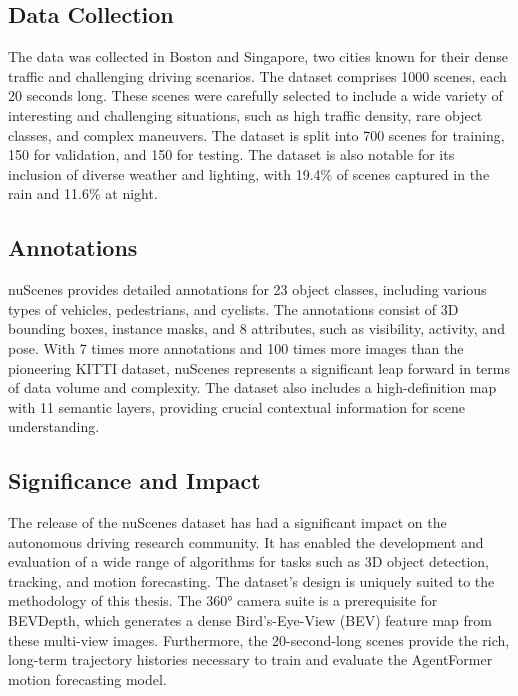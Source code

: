 \subsection{Data Collection}

The data was collected in Boston and Singapore, two cities known for their dense traffic and challenging driving scenarios. The dataset comprises 1000 scenes, each 20 seconds long. These scenes were carefully selected to include a wide variety of interesting and challenging situations, such as high traffic density, rare object classes, and complex maneuvers. The dataset is split into 700 scenes for training, 150 for validation, and 150 for testing. The dataset is also notable for its inclusion of diverse weather and lighting, with 19.4\% of scenes captured in the rain and 11.6\% at night.

\subsection{Annotations}

nuScenes provides detailed annotations for 23 object classes, including various types of vehicles, pedestrians, and cyclists. The annotations consist of 3D bounding boxes, instance masks, and 8 attributes, such as visibility, activity, and pose. With 7 times more annotations and 100 times more images than the pioneering KITTI dataset, nuScenes represents a significant leap forward in terms of data volume and complexity. The dataset also includes a high-definition map with 11 semantic layers, providing crucial contextual information for scene understanding.

\subsection{Significance and Impact}

The release of the nuScenes dataset has had a significant impact on the autonomous driving research community. It has enabled the development and evaluation of a wide range of algorithms for tasks such as 3D object detection, tracking, and motion forecasting. The dataset's design is uniquely suited to the methodology of this thesis. The 360° camera suite is a prerequisite for BEVDepth, which generates a dense Bird's-Eye-View (BEV) feature map from these multi-view images. Furthermore, the 20-second-long scenes provide the rich, long-term trajectory histories necessary to train and evaluate the AgentFormer motion forecasting model.

